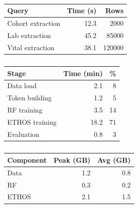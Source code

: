 \begin{table}[h]
\begin{englishblock}
\centering
\caption{}
\begin{tabular}{lrr}
\toprule
Query & Time (s) & Rows \\
\midrule
Cohort extraction & 12.3 & 2000 \\
Lab extraction & 45.2 & 85000 \\
Vital extraction & 38.1 & 120000 \\
\bottomrule
\end{tabular}
\label{tab:sql_perf}
\end{englishblock}
\end{table}

\begin{table}[h]
\begin{englishblock}
\centering
\caption{}
\begin{tabular}{lrr}
\toprule
Stage & Time (min) & \% \\
\midrule
Data load & 2.1 & 8 \\
Token building & 1.2 & 5 \\
RF training & 3.5 & 14 \\
ETHOS training & 18.2 & 71 \\
Evaluation & 0.8 & 3 \\
\bottomrule
\end{tabular}
\label{tab:runtime}
\end{englishblock}
\end{table}

\begin{table}[h]
\begin{englishblock}
\centering
\caption{}
\begin{tabular}{lrr}
\toprule
Component & Peak (GB) & Avg (GB) \\
\midrule
Data & 1.2 & 0.8 \\
RF & 0.3 & 0.2 \\
ETHOS & 2.1 & 1.5 \\
\bottomrule
\end{tabular}
\label{tab:memory}
\end{englishblock}
\end{table}

